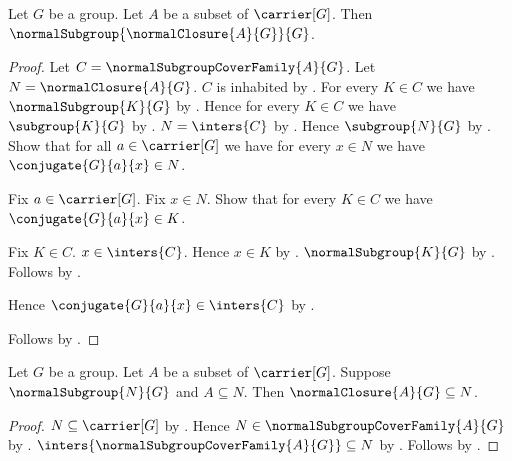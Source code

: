 \begin{theorem}\label{normal_closure_is_normal_subgroup}
    Let $G$ be a group.
    Let $A$ be a subset of $\carrier[G]$.
    Then $\normalSubgroup{\normalClosure{A}{G}}{G}$.
\end{theorem}
\begin{proof}
    Let $C=\normalSubgroupCoverFamily{A}{G}$.
    Let $N=\normalClosure{A}{G}$.
    $C$ is inhabited by
        .
    For every $K\in C$ we have $\normalSubgroup{K}{G}$ by
        .
    Hence for every $K\in C$ we have $\subgroup{K}{G}$ by
        .
    $N=\inters{C}$ by .
    Hence $\subgroup{N}{G}$ by
        .
    Show that for all $a\in\carrier[G]$ we have for every $x\in N$
        we have $\conjugate{G}{a}{x}\in N$.
    \begin{subproof}
        Fix $a\in\carrier[G]$.
        Fix $x\in N$.
        Show that for every $K\in C$ we have
            $\conjugate{G}{a}{x}\in K$.
        \begin{subproof}
            Fix $K\in C$.
            $x\in\inters{C}$.
            Hence $x\in K$ by .
            $\normalSubgroup{K}{G}$ by
                .
            Follows by
                .
        \end{subproof}
        Hence $\conjugate{G}{a}{x}\in\inters{C}$ by
            .
    \end{subproof}
    Follows by .
\end{proof}

\begin{theorem}\label{normal_closure_least}
    Let $G$ be a group.
    Let $A$ be a subset of $\carrier[G]$.
    Suppose $\normalSubgroup{N}{G}$ and $A\subseteq N$.
    Then $\normalClosure{A}{G}\subseteq N$.
\end{theorem}
\begin{proof}
    $N\subseteq\carrier[G]$ by
        .
    Hence $N\in\normalSubgroupCoverFamily{A}{G}$ by
        .
    $\inters{\normalSubgroupCoverFamily{A}{G}}\subseteq N$ by
        .
    Follows by .
\end{proof}

